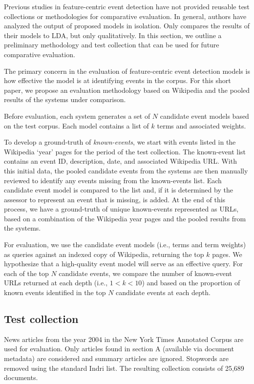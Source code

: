 \documentclass{sig-alternate}
\begin{document}
Previous studies in feature-centric event detection have not provided reusable test collections or methodologies for comparative evaluation. In general, authors have analyzed the output of proposed models in isolation.  Only \cite{Weng2011} compares the results of their models to LDA, but only qualitatively. In this section, we outline a preliminary methodology and test collection that can be used for future comparative evaluation.

The primary concern in the evaluation of feature-centric event detection models is how effective the model is at identifying events in the corpus. For this short paper, we propose an evaluation methodology based on Wikipedia and the pooled results of the systems under comparison.

Before evaluation, each system generates a set of $N$ candidate event models based on the test corpus. Each model contains a list of $k$ terms and associated weights. 

To develop a ground-truth of \emph{known-events}, we start with events listed in the Wikipedia `year' pages for the period of the test collection. The known-event list contains an event ID, description, date, and associated Wikipedia URL. With this initial data, the pooled candidate events from the systems are then manually reviewed to identify any events missing from the known-events list.  Each candidate event model is compared to the list and, if it is determined by the assessor to represent an event that is missing, is added. At the end of this process, we have a ground-truth of unique known-events represented as URLs, based on a combination of the Wikipedia year pages and the pooled results from the systems.  

For evaluation, we use the candidate event models (i.e., terms and term weights) as queries against an indexed copy of Wikipedia, returning the top $k$ pages.  We hypothesize that a high-quality event model will serve as an effective query. For each of the top $N$ candidate events, we compare the number of known-event URLs returned at each depth (i.e., $1 < k < 10$) and based on the proportion of known events identified in the top $N$ candidate events at each depth.


\subsection{Test collection}
News articles from the year 2004 in the New York Times Annotated Corpus \cite{Sandhaus2008} are used for evaluation. Only articles found in section A (available via document metadata) are considered and summary articles are ignored. Stopwords are removed using the standard Indri list. The resulting collection consists of 25,689 documents.
\end{document}
